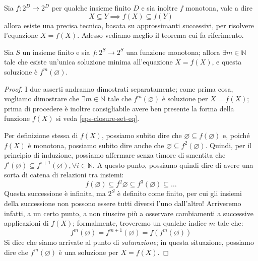 \documentclass[class=book, crop=false, oneside, 12pt]{standalone}
\begin{document}
Sia \(f: 2^D \to 2^D\) per qualche insieme finito \(D\) e sia inoltre \( f \) monotona, vale a dire
\begin{equation*}
    X \subseteq Y \implies f(X) \subseteq f(Y)
\end{equation*}
allora esiste una precisa tecnica, basata su approssimanti successivi, per risolvere l'equazione \(X = f(X)\). Adesso vediamo meglio il teorema cui fa riferimento.

\begin{theorem}
    Sia \(S\) un insieme finito e sia \(f: 2^S \to 2^S\) una funzione monotona; allora \(\exists m \in \mathbb{N}\) tale che esiste un'unica soluzione minima all'equazione \(X = f(X)\), e questa soluzione è \(f^m(\varnothing)\).
\end{theorem}

\begin{proof}
    I due asserti andranno dimostrati separatamente; come prima cosa, vogliamo dimostrare che \(\exists m \in \mathbb{N}\) tale che \(f^m(\varnothing)\) è soluzione per \(X = f(X)\); prima di procedere è inoltre consigliabile avere ben presente la forma della funzione \(f(X)\) si veda \ref{eps-closure-set-eq}.

    Per definizione stessa di \(f(X)\), possiamo subito dire che \(\varnothing \subseteq f(\varnothing)\) e, poiché \(f(X)\) è monotona, possiamo subito dire anche che \(\varnothing \subseteq f^2(\varnothing)\). Quindi, per il principio di induzione, possiamo affermare senza timore di smentita che \(f^i(\varnothing) \subseteq f^{i + 1}(\varnothing), \forall i \in \mathbb{N} \). A questo punto, possiamo quindi dire di avere una sorta di catena di relazioni tra insiemi:
    \begin{equation*}
        f(\varnothing) \subseteq f^2{\varnothing} \subseteq f^3(\varnothing) \subseteq \ldots
    \end{equation*}
    Questa successione è infinita, ma \(2^S\) è definito come finito, per cui gli insiemi della successione non possono essere tutti diversi l'uno dall'altro! Arriveremo infatti, a un certo punto, a non riuscire più a osservare cambiamenti a successive applicazioni di \(f(X)\); formalmente, troveremo un qualche indice \(m\) tale che:
    \begin{equation*}
        f^m(\varnothing) = f^{m + 1} (\varnothing) = f(f^m(\varnothing))
    \end{equation*}
    Si dice che siamo arrivate al punto di \emph{saturazione}; in questa situazione, possiamo dire che \(f^m(\varnothing)\) è una soluzione per \(X = f(X)\).


\end{proof}
\end{document}
